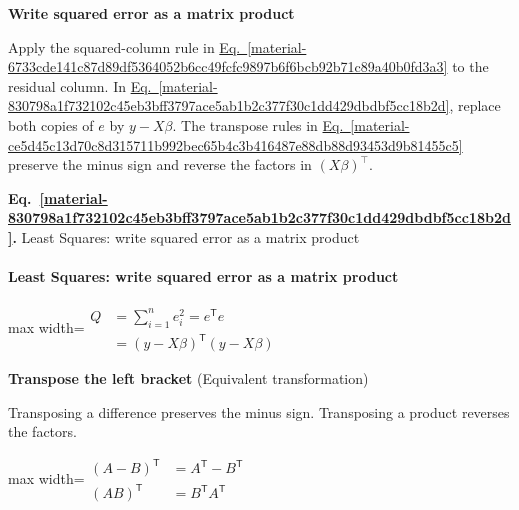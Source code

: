 \documentclass[11pt,a4paper]{article}
\begin{document}
\textbf{Write squared error as a matrix product}


Apply the squared-column rule in \hyperref[material-6733cde141c87d89df5364052b6cc49fcfc9897b6f6bcb92b71c89a40b0fd3a3]{Eq.~\ref*{material-6733cde141c87d89df5364052b6cc49fcfc9897b6f6bcb92b71c89a40b0fd3a3}} to the residual column. In \hyperref[material-830798a1f732102c45eb3bff3797ace5ab1b2c377f30c1dd429dbdbf5cc18b2d]{Eq.~\ref*{material-830798a1f732102c45eb3bff3797ace5ab1b2c377f30c1dd429dbdbf5cc18b2d}}, replace both copies of \(e\) by \(y-X\beta\). The transpose rules in \hyperref[material-ce5d45c13d70c8d315711b992bec65b4c3b416487e88db88d93453d9b81455c5]{Eq.~\ref*{material-ce5d45c13d70c8d315711b992bec65b4c3b416487e88db88d93453d9b81455c5}} preserve the minus sign and reverse the factors in \((X\beta)^\top\).


\par\medskip
{}
\label{material-830798a1f732102c45eb3bff3797ace5ab1b2c377f30c1dd429dbdbf5cc18b2d}
\noindent\textbf{Eq.~\ref*{material-830798a1f732102c45eb3bff3797ace5ab1b2c377f30c1dd429dbdbf5cc18b2d}.} Least Squares: write squared error as a matrix product\par\nopagebreak
\paragraph{Least Squares: write squared error as a matrix product}
\begin{center}\begin{adjustbox}{max width=\linewidth}$\displaystyle \begin{aligned}Q&=\sum_{i=1}^{n}e_i^2=e^{\mathsf T}e\\&=(y-X\beta)^{\mathsf T}(y-X\beta)\end{aligned}$\end{adjustbox}\end{center}
\noindent\textbf{Transpose the left bracket} (Equivalent transformation)\par
Transposing a difference preserves the minus sign. Transposing a product reverses the factors.
\begin{center}\begin{adjustbox}{max width=\linewidth}$\displaystyle \begin{aligned}(A-B)^{\mathsf T}&=A^{\mathsf T}-B^{\mathsf T}\\(AB)^{\mathsf T}&=B^{\mathsf T}A^{\mathsf T}\end{aligned}$\end{adjustbox}\end{center}
\end{document}
